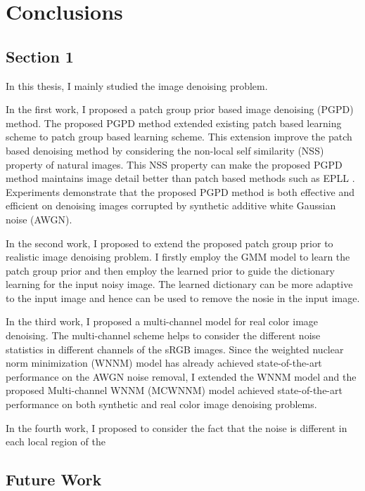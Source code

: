 %
\chapter{Conclusions}
\label{sec:conclusions}


\section{Section 1}
\label{sec:conclusions:sec1}
In this thesis, I mainly studied the image denoising problem. 

In the first work, I proposed a patch group prior based image denoising (PGPD) method. The proposed PGPD method extended existing patch based learning scheme to patch group based learning scheme. This extension improve the patch based denoising method by considering the non-local self similarity (NSS) property of natural images. This NSS property can make the proposed PGPD method maintains image detail better than patch based methods such as EPLL \cite{epll}. Experiments demonstrate that the proposed PGPD method is both effective and efficient on denoising images corrupted by synthetic additive white Gaussian noise (AWGN).

In the second work, I proposed to extend the proposed patch group prior to realistic image denoising problem. I firstly employ the GMM model to learn the patch group prior and then employ the learned prior to guide the dictionary learning for the input noisy image. The learned dictionary can be more adaptive to the input image and hence can be used to remove the nosie in the input image.

In the third work, I proposed a multi-channel model for real color image denoising. The multi-channel scheme helps to consider the different noise statistics in different channels of the sRGB images. Since the weighted nuclear norm minimization (WNNM) model has already achieved state-of-the-art performance on the AWGN noise removal, I extended the WNNM model and the proposed Multi-channel WNNM (MCWNNM) model achieved state-of-the-art performance on both synthetic and real color image denoising problems. 

In the fourth work, I proposed to consider the fact that the noise is different in each local region of the 





\section{Future Work}
\label{sec:conclusions:future}


